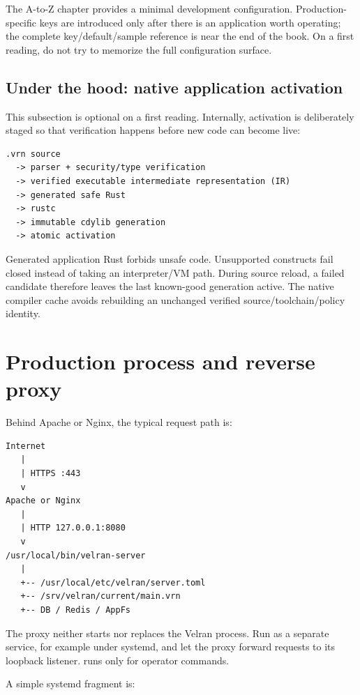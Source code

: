 The A-to-Z chapter provides a minimal development configuration. Production-specific keys are introduced only after there is an application worth operating; the complete key/default/sample reference is near the end of the book. On a first reading, do not try to memorize the full configuration surface.

\subsection*{Under the hood: native application activation}

This subsection is optional on a first reading. Internally, activation is deliberately staged so that verification happens before new code can become live:

\begin{lstlisting}
.vrn source
  -> parser + security/type verification
  -> verified executable intermediate representation (IR)
  -> generated safe Rust
  -> rustc
  -> immutable cdylib generation
  -> atomic activation
\end{lstlisting}

Generated application Rust forbids unsafe code. Unsupported constructs fail closed instead of taking an interpreter/VM path. During source reload, a failed candidate therefore leaves the last known-good generation active. The native compiler cache avoids rebuilding an unchanged verified source/toolchain/policy identity.

\section{Production process and reverse proxy}

Behind Apache or Nginx, the typical request path is:

\begin{lstlisting}
Internet
   |
   | HTTPS :443
   v
Apache or Nginx
   |
   | HTTP 127.0.0.1:8080
   v
/usr/local/bin/velran-server
   |
   +-- /usr/local/etc/velran/server.toml
   +-- /srv/velran/current/main.vrn
   +-- DB / Redis / AppFs
\end{lstlisting}

The proxy neither starts nor replaces the Velran process. Run  as a separate service, for example under systemd, and let the proxy forward requests to its loopback listener.  runs only for operator commands.

A simple systemd  fragment is:

